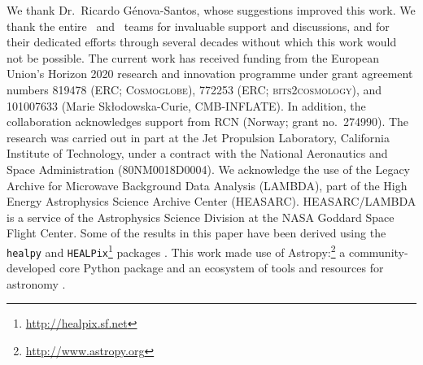 \begin{acknowledgements}
  We thank Dr.~Ricardo Génova-Santos, whose suggestions improved this work.
  We thank the entire \Planck\ and \WMAP\ teams for invaluable support
  and discussions, and for their dedicated efforts through several
  decades without which this work would not be possible. The current
  work has received funding from the European Union’s Horizon 2020
  research and innovation programme under grant agreement numbers
  819478 (ERC; \textsc{Cosmoglobe}), 772253 (ERC;
  \textsc{bits2cosmology}), and 101007633 (Marie Skłodowska-Curie,
  \textsc{CMB-INFLATE}). In addition, the collaboration acknowledges
  support from RCN (Norway; grant no.\ 274990). The research was
  carried out in part at the Jet Propulsion Laboratory, California
  Institute of Technology, under a contract with the National
  Aeronautics and Space Administration (80NM0018D0004).  We
  acknowledge the use of the Legacy Archive for Microwave Background
  Data Analysis (LAMBDA), part of the High Energy Astrophysics Science
  Archive Center (HEASARC). HEASARC/LAMBDA is a service of the
  Astrophysics Science Division at the NASA Goddard Space Flight
  Center.  Some of the results in this paper have been derived using
  the \texttt{healpy} and
  \texttt{HEALPix}\footnote{\url{http://healpix.sf.net}} packages
  \citep{gorski2005, Zonca2019}.  This work made use of
  Astropy:\footnote{\url{http://www.astropy.org}} a
  community-developed core Python package and an ecosystem of tools
  and resources for astronomy \citep{astropy:2013, astropy:2018,
    astropy:2022}.
\end{acknowledgements}
